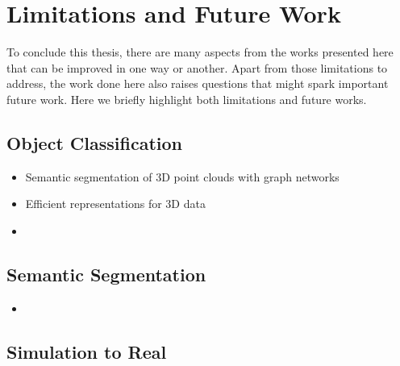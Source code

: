 \section{Limitations and Future Work}
\label{cha:conclusion:sec:future}

To conclude this thesis, there are many aspects from the works presented here that can be improved in one way or another. Apart from those limitations to address, the work done here also raises questions that might spark important future work. Here we briefly highlight both limitations and future works.

\subsection{Object Classification}

\begin{itemize}
    \item Semantic segmentation of \ac{3D} point clouds with graph networks
    \item Efficient representations for \acs{3D} data
    \item 
\end{itemize}

\subsection{Semantic Segmentation}

\begin{itemize}
    \item 
\end{itemize}

\subsection{Simulation to Real}

